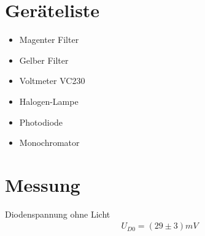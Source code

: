 \documentclass[a4paper]{article}
\begin{document}
\section{Geräteliste}
\begin{itemize}
  \item Magenter Filter
  \item Gelber Filter
  \item Voltmeter VC230
  \item Halogen-Lampe
  \item Photodiode
  \item Monochromator
\end{itemize}
\newpage

\section{Messung}

Diodenspannung ohne Licht
\begin{align}
  U_{D0}=(29\pm3)mV
  \label{diode}
\end{align}
\end{document}

